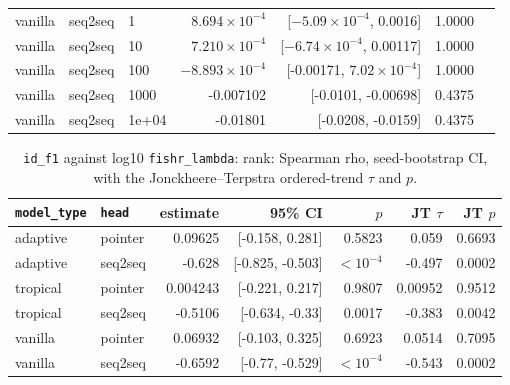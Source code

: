 \documentclass[10pt]{article}
\begin{document}
{\begin{longtable}{lllrrrl}
vanilla & seq2seq & 1 & $8.694\times10^{-4}$ & [$-5.09\times10^{-4}$, 0.0016] & 1.0000 & \\
vanilla & seq2seq & 10 & $7.210\times10^{-4}$ & [$-6.74\times10^{-4}$, 0.00117] & 1.0000 & \\
vanilla & seq2seq & 100 & $-8.893\times10^{-4}$ & [-0.00171, $7.02\times10^{-4}$] & 1.0000 & \\
vanilla & seq2seq & 1000 & -0.007102 & [-0.0101, -0.00698] & 0.4375 & \\
vanilla & seq2seq & 1e+04 & -0.01801 & [-0.0208, -0.0159] & 0.4375 & \\
\bottomrule
\end{longtable}
}

{\small
\begin{longtable}{llrrrrr}
\caption{\texttt{id\_f1} against log10 \texttt{fishr\_lambda}: rank: Spearman rho, seed-bootstrap CI, with the Jonckheere--Terpstra ordered-trend $\tau$ and $p$.}\label{tab:trend-id_f1}\\
\toprule
\texttt{model\_type} & \texttt{head} & estimate & 95\% CI & $p$ & JT $\tau$ & JT $p$\\
\midrule
\endhead
adaptive & pointer & 0.09625 & [-0.158, 0.281] & 0.5823 & 0.059 & 0.6693\\
adaptive & seq2seq & -0.628 & [-0.825, -0.503] & $<10^{-4}$ & -0.497 & 0.0002\\
tropical & pointer & 0.004243 & [-0.221, 0.217] & 0.9807 & 0.00952 & 0.9512\\
tropical & seq2seq & -0.5106 & [-0.634, -0.33] & 0.0017 & -0.383 & 0.0042\\
vanilla & pointer & 0.06932 & [-0.103, 0.325] & 0.6923 & 0.0514 & 0.7095\\
vanilla & seq2seq & -0.6592 & [-0.77, -0.529] & $<10^{-4}$ & -0.543 & 0.0002\\
\bottomrule
\end{longtable}
}
\end{document}

